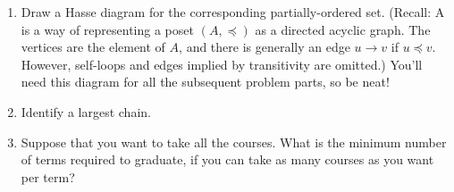 \documentclass[12pt]{article}
\newcommand{\mfigure}[3]{\bigskip\centerline{\resizebox{#1}{#2}{\texttt{[image: \#3]}}}\bigskip}
\begin{document}
\begin{enumerate}

\item Draw a Hasse diagram for the corresponding partially-ordered
set.  (Recall: A  is a way of representing a poset $(A,
\preceq)$ as a directed acyclic graph.  The vertices are the element
of $A$, and there is generally an edge $u \to v$ if $u \preceq v$.
However, self-loops and edges implied by transitivity are omitted.)
You'll need this diagram for all the subsequent problem parts, so be
neat!


\item Identify a largest chain.  %


\item Suppose that you want to take all the courses.  What is the
minimum number of terms required to graduate, if you can take as many
courses as you want per term?



\end{enumerate}
\end{document}
